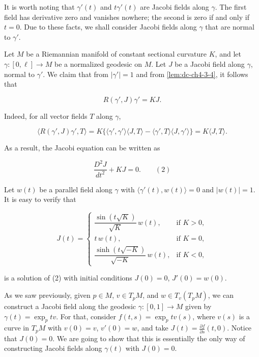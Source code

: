 \begin{remark}[Remark 2.2]
  \label{rem:dc-ch5-2-2}
  It is worth noting that $\gamma'(t)$ and $t\gamma'(t)$ are Jacobi fields along
  $\gamma$. The first field has derivative zero and vanishes nowhere; the second is
  zero if and only if $t=0$. Due to these facts, we shall consider Jacobi fields
  along $\gamma$ that are normal to $\gamma'$.
\end{remark}

\begin{example}
  \label{ex:dc-ch5-2-3}
  Let $M$ be a Riemannian manifold of constant sectional curvature $K$, and let
  $\gamma:[0,\ell]\to M$ be a normalized geodesic on $M$. Let $J$ be a Jacobi field
  along $\gamma$, normal to $\gamma'$. We claim that from $|\gamma'|=1$ and from
  \cref{lem:dc-ch4-3-4}, it follows that
  
  $$
  R(\gamma',J)\gamma'=KJ.
  $$
  
  Indeed, for all vector fields $T$ along $\gamma$,
  
  $$
  \langle R(\gamma',J)\gamma',T\rangle=K\{\langle\gamma',\gamma'\rangle\langle J,T\rangle-\langle\gamma',T\rangle\langle J,\gamma'\rangle\}=K\langle J,T\rangle.
  $$
  
  As a result, the Jacobi equation can be written as
  
  $$
  \frac{D^2 J}{dt^2}+KJ=0.\qquad(2)
  $$
  
  Let $w(t)$ be a parallel field along $\gamma$ with $\langle\gamma'(t),w(t)\rangle=0$
  and $|w(t)|=1$. It is easy to verify that
  
  $$
  J(t)=\begin{cases}\dfrac{\sin(t\sqrt{K})}{\sqrt{K}}\,w(t),&\text{if }K>0,\\[1ex] t\,w(t),&\text{if }K=0,\\[1ex]\dfrac{\sinh(t\sqrt{-K})}{\sqrt{-K}}\,w(t),&\text{if }K<0,\end{cases}
  $$
  
  is a solution of (2) with initial conditions $J(0)=0$, $J'(0)=w(0)$.
  
  As we saw previously, given $p\in M$, $v\in T_p M$, and $w\in T_v(T_p M)$, we can
  construct a Jacobi field along the geodesic $\gamma:[0,1]\to M$ given by
  $\gamma(t)=\exp_p tv$. For that, consider $f(t,s)=\exp_p tv(s)$, where $v(s)$ is a
  curve in $T_p M$ with $v(0)=v$, $v'(0)=w$, and take
  $J(t)=\frac{\partial f}{\partial s}(t,0)$. Notice that $J(0)=0$. We are going to
  show that this is essentially the only way of constructing Jacobi fields along
  $\gamma(t)$ with $J(0)=0$.
\end{example}


